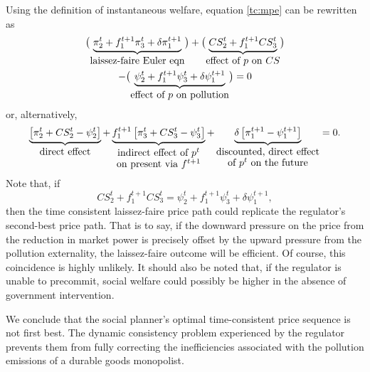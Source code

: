 Using the definition of instantaneous welfare, equation \eqref{tc:mpe} can
be rewritten as 
\begin{multline}
\bigl(\underbrace{\pi _{2}^{t}+f_{1}^{t+1}\pi _{3}^{t}+\delta \pi _{1}^{t+1}}%
_{\mbox{laissez-faire Euler eqn}}\bigr)+\bigl(\underbrace{%
CS_{2}^{t}+f_{1}^{t+1}CS_{3}^{t}}_{\mbox{effect of $p$ on $CS$}}\bigr)
\label{eq:15} \\
-\bigl(\underbrace{\psi _{2}^{t}+f_{1}^{t+1}\psi _{3}^{t}+\delta \psi
_{1}^{t+1}}_{\mbox{effect of $p$ on pollution}}\bigr)=0
\end{multline}%
or, alternatively, 
\begin{equation}
\underbrace{\left[ \pi _{2}^{t}+CS_{2}^{t}-\psi _{2}^{t}\right] }_{%
\mbox{direct effect}}+\underbrace{f_{1}^{t+1}\left[ \pi
_{3}^{t}+CS_{3}^{t}-\psi _{3}^{t}\right] }_{\substack{ \mbox{indirect effect
of $p^t$} \\ \mbox{on
        present via $f^{t+1}$}}}+\underbrace{\delta \left[ \pi
_{1}^{t+1}-\psi _{1}^{t+1}\right] }_{\substack{ 
\mbox{discounted, direct
        effect} \\ \mbox{of $p^t$ on the future}}}=0.  \label{eq:16}
\end{equation}%
Note that, if 
\begin{equation}
CS_{2}^{t}+f_{1}^{t+1}CS_{3}^{t}=\psi _{2}^{t}+f_{1}^{t+1}\psi
_{3}^{t}+\delta \psi _{1}^{t+1},  \label{eq:17}
\end{equation}%
then the time consistent laissez-faire price path could replicate the
regulator's second-best price path. That is to say, if the downward pressure
on the price from the reduction in market power is precisely offset by the
upward pressure from the pollution externality, the laissez-faire outcome
will be efficient. Of course, this coincidence is highly unlikely. It should
also be noted that, if the regulator is unable to precommit, social welfare
could possibly be higher in the absence of government intervention.

We conclude that the social planner's optimal time-consistent price sequence
is not first best. The dynamic consistency problem experienced by the
regulator prevents them from fully correcting the inefficiencies associated
with the pollution emissions of a durable goods monopolist.


